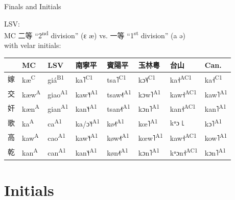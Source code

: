 \documentclass{beamer}
\begin{document}
\begin{frame}[fragile]{Finals and Initials}

LSV:\\ 
MC 二等 \enquote{2\textsuperscript{nd} division} (ɛ æ) vs. 一等 \enquote{1\textsuperscript{st} division} (a ə)\\
with velar initials:\\

\bigskip
{\small
\begin{tabular}{l l|l l l l l l}
 & MC & LSV & 南寧平 & 賓陽平 & 玉林粵 & 台山 & Can.\\ \hline
嫁 & kæ\textsuperscript{C} & giá\textsuperscript{B1} & ka˥\textsuperscript{C1} & tsa˥\textsuperscript{C1} & kɔ˥˨\textsuperscript{C1} & ka˧\textsuperscript{AC1} & ka˧\textsuperscript{C1}\\
交 & kæw\textsuperscript{A} & giao\textsuperscript{A1} & kaw˥˧\textsuperscript{A1} & tsaw˨˦\textsuperscript{A1} & kɔw˥\textsuperscript{A1} & kaw˧\textsuperscript{AC1} & kaw˥\textsuperscript{A1}\\
奸 & kæn\textsuperscript{A} & gian\textsuperscript{A1} & kan˥˧\textsuperscript{A1} & tsan˨˦\textsuperscript{A1} & kɔn˥\textsuperscript{A1} & kan˧\textsuperscript{AC1} & kan˥\textsuperscript{A1}\\ \hline
歌 & ka\textsuperscript{A} & ca\textsuperscript{A1} & ka/ɔ˥˧\textsuperscript{A1} & kø˨˦\textsuperscript{A1} & kœ˥\textsuperscript{A1} & kᵘɔ ꜖ & kɔ˥\textsuperscript{A1}\\
高 & kaw\textsuperscript{A} & cao\textsuperscript{A1} & kaw˥˧\textsuperscript{A1} & køw˨˦\textsuperscript{A1} & kœw˥\textsuperscript{A1} & kaw˧\textsuperscript{AC1} & kow˥\textsuperscript{A1}\\
乾 & kan\textsuperscript{A} & can\textsuperscript{A1} & kan˥˧\textsuperscript{A1} & køn˨˦\textsuperscript{A1} & kɔn˥\textsuperscript{A1} & kᵘɔn˧\textsuperscript{AC1} & kɔn˥\textsuperscript{A1}\\

\end{tabular}
}
\end{frame}

\section{Initials}
\end{document}
